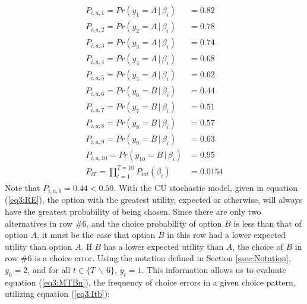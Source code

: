 \documentclass[../main.tex]{subfiles}
\begin{document}
\begin{align}
	\label{eq3:example_PiT}
	\begin{split}
		P_{i,a,1}  = Pr(y_1 = A    \,|\, \beta_i)    &= 0.82 \\
		P_{i,a,2}  = Pr(y_2 = A    \,|\, \beta_i)    &= 0.78 \\
		P_{i,a,3}  = Pr(y_3 = A    \,|\, \beta_i)    &= 0.74 \\
		P_{i,a,4}  = Pr(y_4 = A    \,|\, \beta_i)    &= 0.68 \\
		P_{i,a,5}  = Pr(y_5 = A    \,|\, \beta_i)    &= 0.62 \\
		P_{i,a,6}  = Pr(y_6 = B    \,|\, \beta_i)    &= 0.44 \\
		P_{i,a,7}  = Pr(y_7 = B    \,|\, \beta_i)    &= 0.51 \\
		P_{i,a,8}  = Pr(y_8 = B    \,|\, \beta_i)    &= 0.57 \\
		P_{i,a,9}  = Pr(y_9 = B    \,|\, \beta_i)    &= 0.63 \\
		P_{i,a,10} = Pr(y_{10} = B \,|\, \beta_i)    &= 0.95 \\
		P_{iT}     = \prod_{t = 1}^{T = 10} P_{iat}(\beta_i)  &= 0.0154
	\end{split}
\end{align}
\noindent Note that $P_{i,a,6} = 0.44 < 0.50$.
With the CU stochastic model, given in equation (\ref{eq3:RE}), the option with the greatest utility, expected or otherwise, will always have the greatest probability of being chosen.
Since there are only two alternatives in row \#6, and the choice probability of option $B$ is less than that of option $A$, it must be the case that option $B$ in this row had a lower expected utility than option $A$.
If $B$ has a lower expected utility than $A$, the choice of $B$ in row \#6 is a choice error.
Using the notation defined in Section \ref{ssec:Notation}, $y_6 = 2$, and for all $t \in \lbrace T \,\backslash\, 6 \rbrace$, $y_t = 1$.
This information allows us to evaluate equation (\ref{eq3:MTBn}), the frequency of choice errors in a given choice pattern, utilizing equation (\ref{eq3:Itb}):
\end{document}
